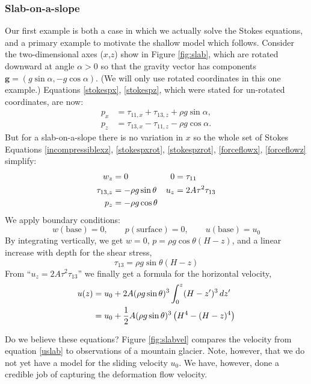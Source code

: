 \documentclass[titlepage,letterpaper,final,12pt]{scrartcl}
\begin{document}
\subsubsection*{Slab-on-a-slope}  Our first example is both a case in which we actually solve the Stokes equations, and a primary example to motivate the shallow model which follows.  Consider the two-dimensional axes ($x$,$z$) show in Figure \ref{fig:slab}, which are rotated downward at angle $\alpha>0$ so that the gravity vector has components $\mathbf{g} = (g \sin\alpha,- g \cos \alpha)$.  (We will only use rotated coordinates in this one example.)  Equations \eqref{stokespx}, \eqref{stokespz}, which were stated for un-rotated coordinates, are now:
\begin{align}
p_x &= \tau_{11,x} + \tau_{13,z} + \rho g \sin\alpha, \label{stokespxrot} \\
p_z &= \tau_{13,x} - \tau_{11,z} - \rho g \cos\alpha. \label{stokespzrot}
\end{align}
But for a slab-on-a-slope there is no variation in $x$ so the whole set of Stokes Equations \eqref{incompressiblexz}, \eqref{stokespxrot}, \eqref{stokespzrot}, \eqref{forceflowx}, \eqref{forceflowz} simplify:
\begin{align}
w_z &= 0 &   0 &= \tau_{11} \label{slabblock} \\
\tau_{13,z} &= - \rho g \sin\theta &   u_z &= 2 A \tau^2 \tau_{13} \notag \\
p_z &= - \rho g \cos\theta \notag
\end{align}
We apply boundary conditions:
	$$w(\text{base})=0, \qquad p(\text{surface})=0, \qquad u(\text{base})=u_0$$
By integrating vertically, we get $w=0$, $p = \rho g \cos\theta (H-z)$, and a linear increase with depth for the shear stress,
	$$\tau_{13} = \rho g \sin\theta (H-z)$$
From ``$u_z = 2 A \tau^2 \tau_{13}$'' we finally get a formula for the horizontal velocity,
\begin{align}
u(z) &= u_0 + 2 A (\rho g \sin\theta)^3 \int_0^z (H-z')^3\,dz' \label{uslab} \\
     &= u_0 + \frac{1}{2} A (\rho g \sin\theta)^3  \left(H^4 - (H-z)^4\right) \notag
\end{align}

Do we believe these equations?  Figure \ref{fig:slabvel} compares the velocity from equation \eqref{uslab} to observations of a mountain glacier.  Note, however, that we do not yet have a model for the sliding velocity $u_0$.  We have, however, done a credible job of capturing the deformation flow velocity.
\end{document}
